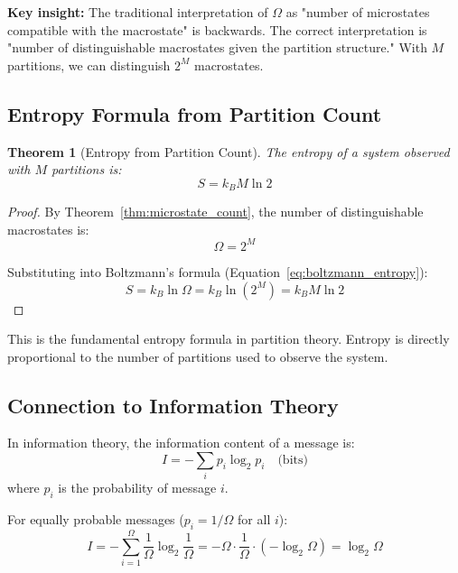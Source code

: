 \documentclass[twocolumn,10pt]{article}
\newtheorem{theorem}{Theorem}[section]
\theoremstyle{definition}
\theoremstyle{remark}
\begin{document}
\noindent\textbf{Key insight:} The traditional interpretation of $\Omega$ as "number of microstates compatible with the macrostate" is backwards. The correct interpretation is "number of distinguishable macrostates given the partition structure." With $M$ partitions, we can distinguish $2^M$ macrostates.

\subsection{Entropy Formula from Partition Count}

\begin{theorem}[Entropy from Partition Count]
\label{thm:entropy_partition_count}
The entropy of a system observed with $M$ partitions is:
\begin{equation}
S = k_B M \ln 2
\end{equation}
\end{theorem}

\begin{proof}
By Theorem~\ref{thm:microstate_count}, the number of distinguishable macrostates is:
\begin{equation}
\Omega = 2^M
\end{equation}

Substituting into Boltzmann's formula (Equation~\ref{eq:boltzmann_entropy}):
\begin{equation}
S = k_B \ln \Omega = k_B \ln(2^M) = k_B M \ln 2
\end{equation}
\end{proof}

\noindent This is the fundamental entropy formula in partition theory. Entropy is directly proportional to the number of partitions used to observe the system.

\subsection{Connection to Information Theory}

In information theory\cite{shannon1948}, the information content of a message is:
\begin{equation}
I = -\sum_i p_i \log_2 p_i \quad \text{(bits)}
\end{equation}
where $p_i$ is the probability of message $i$.

For equally probable messages ($p_i = 1/\Omega$ for all $i$):
\begin{equation}
I = -\sum_{i=1}^{\Omega} \frac{1}{\Omega} \log_2 \frac{1}{\Omega} = -\Omega \cdot \frac{1}{\Omega} \cdot (-\log_2 \Omega) = \log_2 \Omega
\end{equation}
\end{document}
